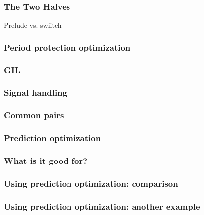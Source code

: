 \begin{frame}
\frametitle{The Two Halves}
Prelude vs. swiitch
\end{frame}

\begin{frame}
\frametitle{Period protection optimization}
\end{frame}

\begin{frame}
\frametitle{GIL}
\end{frame}

\begin{frame}
\frametitle{Signal handling}
\end{frame}

\begin{frame}
\frametitle{Common pairs}
\end{frame}

\begin{frame}
\frametitle{Prediction optimization}
\end{frame}

\begin{frame}
\frametitle{What is it good for?}
\end{frame}

\begin{frame}
\frametitle{Using prediction optimization: comparison}
\end{frame}

\begin{frame}
\frametitle{Using prediction optimization: another example}
\end{frame}


